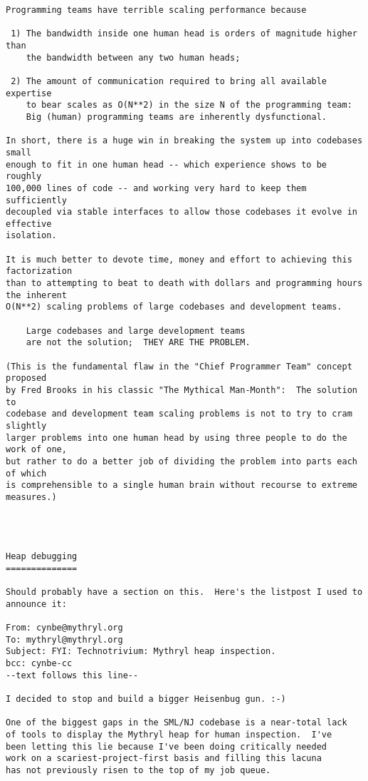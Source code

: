 \begin{verbatim}
Programming teams have terrible scaling performance because

 1) The bandwidth inside one human head is orders of magnitude higher than
    the bandwidth between any two human heads;

 2) The amount of communication required to bring all available expertise
    to bear scales as O(N**2) in the size N of the programming team:
    Big (human) programming teams are inherently dysfunctional.

In short, there is a huge win in breaking the system up into codebases small
enough to fit in one human head -- which experience shows to be roughly
100,000 lines of code -- and working very hard to keep them sufficiently
decoupled via stable interfaces to allow those codebases it evolve in effective
isolation.

It is much better to devote time, money and effort to achieving this factorization
than to attempting to beat to death with dollars and programming hours the inherent
O(N**2) scaling problems of large codebases and development teams.

    Large codebases and large development teams
    are not the solution;  THEY ARE THE PROBLEM.

(This is the fundamental flaw in the "Chief Programmer Team" concept proposed
by Fred Brooks in his classic "The Mythical Man-Month":  The solution to 
codebase and development team scaling problems is not to try to cram slightly
larger problems into one human head by using three people to do the work of one,
but rather to do a better job of dividing the problem into parts each of which
is comprehensible to a single human brain without recourse to extreme measures.)




Heap debugging
==============

Should probably have a section on this.  Here's the listpost I used to announce it:

From: cynbe@mythryl.org 
To: mythryl@mythryl.org 
Subject: FYI: Technotrivium: Mythryl heap inspection. 
bcc: cynbe-cc 
--text follows this line-- 
 
I decided to stop and build a bigger Heisenbug gun. :-) 
 
One of the biggest gaps in the SML/NJ codebase is a near-total lack 
of tools to display the Mythryl heap for human inspection.  I've 
been letting this lie because I've been doing critically needed 
work on a scariest-project-first basis and filling this lacuna 
has not previously risen to the top of my job queue. 
 

\end{verbatim}
